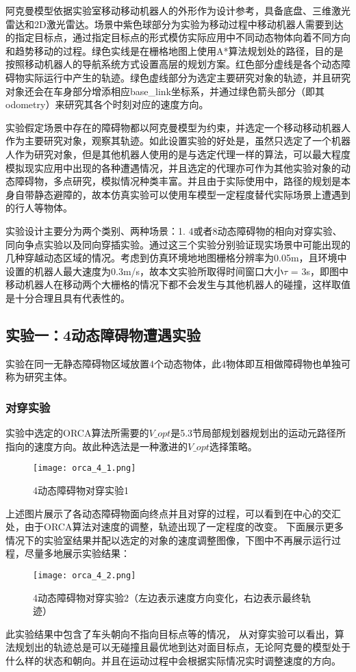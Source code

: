 阿克曼模型依据实验室移动移动机器人的外形作为设计参考，具备底盘、三维激光雷达和2D激光雷达。场景中紫色球部分为实验为移动过程中移动机器人需要到达的指定目标点，通过指定目标点的形式模仿实际应用中不同动态物体向着不同方向和趋势移动的过程。绿色实线是在栅格地图上使用A*算法规划处的路径，目的是按照移动机器人的导航系统方式设置高层的规划方案。红色部分虚线是各个动态障碍物实际运行中产生的轨迹。绿色虚线部分为选定主要研究对象的轨迹，并且研究对象还会在车身部分增添相应base\_link坐标系，并通过绿色箭头部分（即其odometry）来研究其各个时刻对应的速度方向。

实验假定场景中存在的障碍物都以阿克曼模型为约束，并选定一个移动移动机器人作为主要研究对象，观察其轨迹。如此设置实验的好处是，虽然只选定了一个机器人作为研究对象，但是其他机器人使用的是与选定代理一样的算法，可以最大程度模拟现实应用中出现的各种遭遇情况，并且选定的代理亦可作为其他实验对象的动态障碍物，多点研究，模拟情况种类丰富。并且由于实际使用中，路径的规划是本身自带静态避障的，故本仿真实验可以使用车模型一定程度替代实际场景上遭遇到的行人等物体。

实验设计主要分为两个类别、两种场景：1. 4或者8动态障碍物的相向对穿实验、同向争点实验以及同向穿插实验。通过这三个实验分别验证现实场景中可能出现的几种穿越动态区域的情况。考虑到仿真环境地地图栅格分辨率为0.05m，且环境中设置的机器人最大速度为0.3m/s，故本文实验所取得时间窗口大小$\tau$ = 3s，即图中移动机器人在移动两个大栅格的情况下都不会发生与其他机器人的碰撞，这样取值是十分合理且具有代表性的。 

\subsection{实验一：4动态障碍物遭遇实验}
实验在同一无静态障碍物区域放置4个动态物体，此4物体即互相做障碍物也单独可称为研究主体。

\subsubsection{对穿实验}
实验中选定的ORCA算法所需要的$V\_opt$是5.3节局部规划器规划出的运动元路径所指向的速度方向。故此种选法是一种激进的$V\_opt$选择策略。


\begin{figure}[ht]
    \centering
    \texttt{[image: orca\_4\_1.png]}
    \caption{4动态障碍物对穿实验1}
\end{figure}


上述图片展示了各动态障碍物面向终点并且对穿的过程，可以看到在中心的交汇处，由于ORCA算法对速度的调整，轨迹出现了一定程度的改变。
下面展示更多情况下的实验室结果并配以选定的对象的速度调整图像，下图中不再展示运行过程，尽量多地展示实验结果：
\begin{figure}[ht]
    \centering
    \texttt{[image: orca\_4\_2.png]}
    \caption{4动态障碍物对穿实验2（左边表示速度方向变化，右边表示最终轨迹）}
\end{figure}
此实验结果中包含了车头朝向不指向目标点等的情况，
从对穿实验可以看出，算法规划出的轨迹总是可以无碰撞且最优地到达对面目标点，无论阿克曼的模型处于什么样的状态和朝向。并且在运动过程中会根据实际情况实时调整速度的方向。

